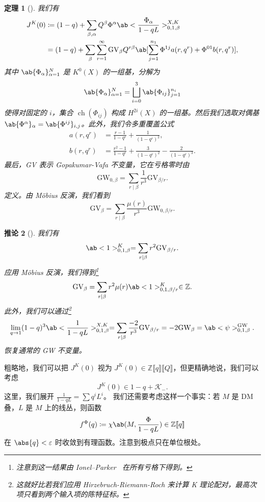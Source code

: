 \documentclass{amsart}
\newtheorem{thm}{定理}[section]
\newtheorem{cor}[thm]{推论}
\theoremstyle{definition}
\theoremstyle{remark}
\theoremstyle{plain}
\theoremstyle{definition}
\theoremstyle{remark}
\newcommand{\Z}{\mathbb{Z}}
\newcommand{\ep}{\varepsilon}
\newcommand{\mc}[1]{\mathcal{#1}}
\newcommand{\mr}[1]{\mathrm{#1}}
\newcommand{\1}{\mathbf{1}}
\newcommand{\2}{\mathbf{2}}
\newcommand{\3}{\mathbf{3}}
\newcommand{\ps}[1]{\llbracket #1 \rrbracket}
\DeclareMathOperator{\ch}{ch}
\begin{document}
\begin{thm}[{\cite{ChouLee2025}}]
    我们有
    \begin{align*}
        J^K(0) &\coloneqq (1-q) + \sum_{\beta, \alpha} Q^{\beta} \Phi^{\alpha} \ab<\frac{\Phi_{\alpha}}{1-qL}>_{0,1,\beta}^{X,K} \\
        &= (1-q) + \sum_{\beta} \sum_{r=1}^{\infty} \mr{GV}_{\beta} Q^{r\beta} \ab[\sum_{j=1}^{n_1} \Phi^{1j} a(r, q^r) + \Phi^{01} b(r, q^r)],
    \end{align*}
    其中 \(\ab\{\Phi_{\alpha}\}_{\alpha=1}^N\) 是 \(K^0(X)\) 的一组基，分解为
    \[ \ab\{\Phi_{\alpha}\}_{\alpha=1}^N = \bigsqcup_{i=0}^3 \ab\{\Phi_{ij}\}_{j=1}^{n_i} \]
    使得对固定的 \(i\)，集合 \(\ch(\Phi_{ij})\) 构成 \(H^{2i}(X)\) 的一组基。然后我们选取对偶基 \(\ab\{\Phi^{\alpha}\}_{\alpha} = \ab\{\Phi^{ij}\}_{i,j}\)。此外，我们令多重覆盖公式
    \begin{align*}
        a(r, q^r) &= \frac{r-1}{1-q^r} + \frac{1}{(1-q^r)^2}, \\
        b(r, q^r) &= \frac{r^2-1}{1-q^r} + \frac{3}{(1-q^r)^2} - \frac{2}{(1-q^r)^3}.
    \end{align*}
    最后，GV 表示 Gopakumar-Vafa 不变量，它在亏格零时由
    \[ \mr{GW}_{0,\beta} = \sum_{r \mid \beta} \frac{1}{r^3} \mr{GV}_{\beta/r}. \]
    定义。由 M\"obius 反演，我们看到
    \[ \mr{GV}_{\beta} = \sum_{r \mid \beta} \frac{\mu(r)}{r^3} \mr{GW}_{0,\beta/r}. \]
\end{thm}

\begin{cor}[{\cite{ChouLee2025}}]
    我们有
    \[ \ab<1>_{0,1,\beta}^K = \sum_{r \mid \beta} r^2 \mr{GV}_{\beta/r}. \]
    应用 M\"obius 反演，我们得到\footnote{注意到这一结果由 Ionel--Parker~\cite{IonelParker2018} 在所有亏格下得到。}
    \[ \mr{GV}_{\beta} = \sum_{r \mid \beta} r^2 \mu(r) \ab<1>_{0,1,\beta/r}^K \in \Z. \]
    此外，我们可以通过\footnote{这就好比若我们应用 Hirzebruch-Riemann-Roch 来计算 K 理论配对，最高次项只看到两个输入项的陈特征标。}
    \[ \lim_{q \to 1} (1-q)^3 \ab<\frac{1}{1-qL}>_{0,1,\beta}^{X,K} = \sum_{r \mid \beta} \frac{-2}{r^3} \mr{GV}_{\beta/r} = -2 \mr{GW}_{\beta} = \ab<\psi>_{0,1,\beta}^{\mr{GW}}. \]
    恢复通常的 GW 不变量。
\end{cor}

粗略地，我们可以把 \(J^K(0)\) 视为 \(J^K(0) \in \Z\ps{q}\ps{Q}\)，但更精确地说，我们可以考虑
\[ J^K(0) \in 1-q + \mc{K}_-. \]
这里，我们展开 \(\frac{1}{1-qL} = \sum q^i L^i\)。 
我们还需要考虑这样一个事实：若 \(M\) 是 DM叠，\(L\) 是 \(M\) 上的线丛，则函数
\[ f^{\Phi}(q) \coloneqq \chi\ab(M, \frac{\Phi}{1-qL}) \in \Z \ps{q} \]
在 \(\abs{q} < \ep\) 时收敛到有理函数。注意到极点只在单位根处。
\end{document}
